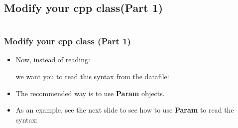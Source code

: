 \documentclass[10pt, hyperref={unicode=true,pdfusetitle, bookmarks=true,bookmarksnumbered=false,bookmarksopen=false, breaklinks=false,pdfborder={0 0 1},backref=true,colorlinks=true,linkcolor=darkblue,pageanchor, urlcolor=darkblue}]{beamer}
\begin{document}
\subsection{{\bf{Modify your cpp class(Part 1)}}}
\begin{frame}
\begin{columns}[c] 
\tableofcontents[sections={1-4},currentsection, currentsubsection]
\tableofcontents[sections={5-10},currentsection, currentsubsection]
\end{columns}
\end{frame}
\begin{frame}
\frametitle{Modify your cpp class (Part 1)}
\begin{block}{}

\begin{itemize}
\item Now, instead of reading:
\begin{center}
\end{center}
%
we want you to read this syntax from the datafile:
\begin{center}
\end{center}

\item The recommended way is to use \textbf{Param} objects.

\item As an example, see the next slide to see how to use \textbf{Param} to read the syntax:
%
\begin{center}
\end{center}
\end{itemize}

\end{block}
\end{frame}
\end{document}
